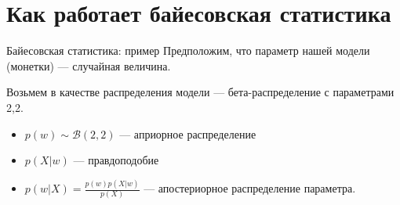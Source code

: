 \documentclass[9pt,pdf,utf8,hyperref={unicode},aspectratio=169]{beamer}
\begin{document}
\section{Как работает байесовская статистика}
\begin{frame}{Байесовская статистика: пример}
Предположим, что параметр нашей модели (монетки) --- случайная величина.

Возьмем в качестве распределения модели --- бета-распределение с параметрами 2,2.

\begin{itemize}
\item $p(w) \sim \mathcal{B}(2,2)$ --- априорное распределение
\item $p(X|w)$ --- правдоподобие
\item $p(w|X) = \frac{p(w)p(X|w)}{p(X)}$ --- апостериорное распределение параметра.
\end{itemize}
\end{frame}
\end{document}
